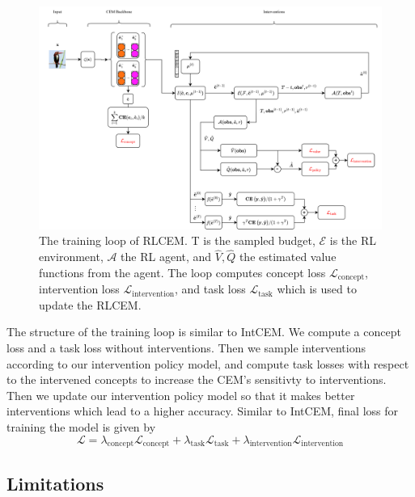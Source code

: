 \begin{figure}
    \centering
    \includegraphics*[width=\textwidth]{figs/method/rlcem.png}
    \caption{The training loop of RLCEM. T is the sampled budget, $\mathcal{E}$ is the RL environment, $\mathcal{A}$ the RL agent, 
    and $\hat{V}, \hat{Q}$ the estimated value functions from the agent. The loop computes concept loss $\mathcal{L}_{\text{concept}}$,
    intervention loss $\mathcal{L}_{\text{intervention}}$, and task loss $\mathcal{L}_{\text{task}}$ which is used to update the
    RLCEM.}
    \label{fig:rlcem}
\end{figure}

The structure of the training loop is similar to IntCEM.
 We compute a concept loss
and a task loss without interventions.
Then we sample interventions according to our intervention policy model,
and compute task losses with respect to the intervened concepts to increase 
the CEM's sensitivty to interventions. Then we update our intervention policy
model so that it makes better interventions which lead to a higher accuracy.
Similar to IntCEM, final loss for training the model is given by 
\[\mathcal{L} = \lambda_{\text{concept}} \mathcal{L}_{\text{concept}}
+  \lambda_{\text{task}} \mathcal{L}_{\text{task}}
+  \lambda_{\text{intervention}} \mathcal{L}_{\text{intervention}}\]

\subsection{Limitations}\label{method:limitations}

